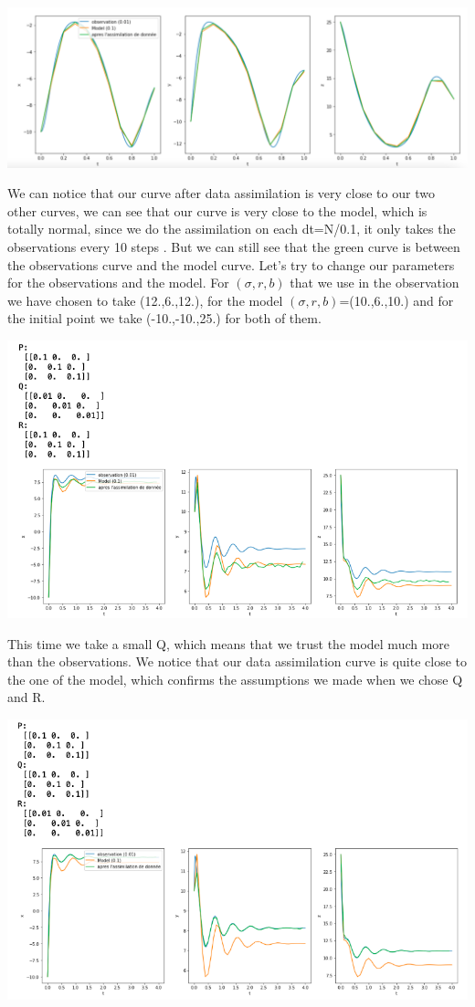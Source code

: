 \begin{center}
		\includegraphics[width=1\textwidth]{"images/lorenz1_b.png"}
\end{center}
We can notice that our curve after data assimilation is very close to our two other curves, we can see that our curve is very close to the model, which is totally normal, since we do the assimilation on each dt=N/0.1, it only takes the observations every 10 steps . But we can still see that the green curve is between the observations curve and the model curve.
Let's try to change our parameters for the observations and the model. For $(\sigma, r, b)$ that we use in the observation we have chosen to take (12.,6.,12.), for the model $(\sigma, r, b)$=(10.,6.,10.) and for the initial point we take (-10.,-10.,25.) for both of them.
 \begin{center}
		\includegraphics[width=1\textwidth]{"images/lorenz2.png"}
\end{center}
This time we take a small Q, which means that we trust the model much more than the observations. We notice that our data assimilation curve is quite close to the one of the model, which confirms the assumptions we made when we chose Q and R.
 \begin{center}
		\includegraphics[width=1\textwidth]{"images/lorenz3.png"}
\end{center}
